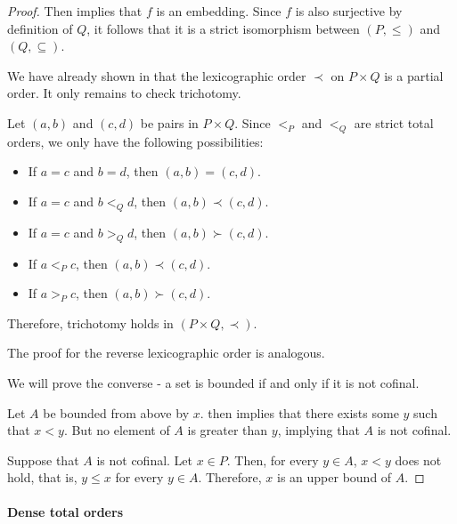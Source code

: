 \begin{proof}
  Then  implies that \( f \) is an embedding. Since \( f \) is also surjective by definition of \( Q \), it follows that it is a strict isomorphism between \( (P, \leq) \) and \( (Q, \subseteq) \).

   We have already shown in  that the lexicographic order \( \prec \) on \( P \times Q \) is a partial order. It only remains to check trichotomy.

  Let \( (a, b) \) and \( (c, d) \) be pairs in \( P \times Q \). Since \( <_P \) and \( <_Q \) are strict total orders, we only have the following possibilities:
  \begin{itemize}
    \item If \( a = c \) and \( b = d \), then \( (a, b) = (c, d) \).
    \item If \( a = c \) and \( b <_Q d \), then \( (a, b) \prec (c, d) \).
    \item If \( a = c \) and \( b >_Q d \), then \( (a, b) \succ (c, d) \).
    \item If \( a <_P c \), then \( (a, b) \prec (c, d) \).
    \item If \( a >_P c \), then \( (a, b) \succ (c, d) \).
  \end{itemize}

  Therefore, trichotomy holds in \( (P \times Q, \prec) \).

  The proof for the reverse lexicographic order is analogous.

   We will prove the converse - a set is bounded if and only if it is not cofinal.

  \SufficiencySubProof* Let \( A \) be bounded from above by \( x \).  then implies that there exists some \( y \) such that \( x < y \). But no element of \( A \) is greater than \( y \), implying that \( A \) is not cofinal.

  \NecessitySubProof* Suppose that \( A \) is not cofinal. Let \( x \in P \). Then, for every \( y \in A \), \( x < y \) does not hold, that is, \( y \leq x \) for every \( y \in A \). Therefore, \( x \) is an upper bound of \( A \).
\end{proof}

\paragraph{Dense total orders}

